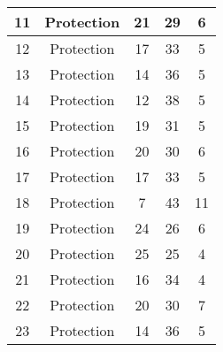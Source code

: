 \documentclass[results.tex]{subfiles}
\begin{document}
\begin{center}
\begin{tabular}{| c || c | c | c | c |}
            \hline
            11                      & Protection                   & 21                     & 29                      & 6                    \\
            \hline
            12                      & Protection                   & 17                     & 33                      & 5                    \\
            \hline
            13                      & Protection                   & 14                     & 36                      & 5                    \\
            \hline
            14                      & Protection                   & 12                     & 38                      & 5                    \\
            \hline
            15                      & Protection                   & 19                     & 31                      & 5                    \\
            \hline
            16                      & Protection                   & 20                     & 30                      & 6                    \\
            \hline
            17                      & Protection                   & 17                     & 33                      & 5                    \\
            \hline
            18                      & Protection                   & 7                      & 43                      & 11                   \\
            \hline
            19                      & Protection                   & 24                     & 26                      & 6                    \\
            \hline
            20                      & Protection                   & 25                     & 25                      & 4                    \\
            \hline
            21                      & Protection                   & 16                     & 34                      & 4                    \\
            \hline
            22                      & Protection                   & 20                     & 30                      & 7                    \\
            \hline
            23                      & Protection                   & 14                     & 36                      & 5                    \\

\end{tabular}
\end{center}
\end{document}
